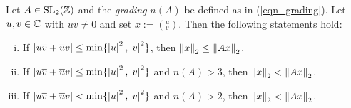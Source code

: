 \begin{theorem}
\label{thm_FunDomUVGlobMin}
Let $A \in \operatorname{SL}_{2}(\mathbb{Z})$ and the \emph{grading} $n(A)$ be defined as in (\ref{eqn_grading}). Let $u,v \in \mathbb{C}$ with $uv \ne 0$ and set $x := ({}^u_v)$. Then the following statements hold:
\begin{enumerate}[(i)]
\item \label{itm_FunDomUVGlobMinA}
If $\left|u\overline{v} + \overline{u}v\right| \le \min\{\left|u\right|^2,\left|v\right|^2\}$, then $\left\| x \right\|_2 \le \left\| Ax \right\|_2$.
\item \label{itm_FunDomUVGlobMinB}
If $\left|u\overline{v} + \overline{u}v\right| \le \min\{\left|u\right|^2,\left|v\right|^2\}$ and $n(A) > 3$, then $\left\| x \right\|_2 < \left\| Ax \right\|_2$.
\item \label{itm_FunDomUVGlobMinC}
If $\left|u\overline{v} + \overline{u}v\right| < \min\{\left|u\right|^2,\left|v\right|^2\}$ and $n(A) > 2$, 
then $\left\| x \right\|_2 < \left\| Ax \right\|_2$.
\end{enumerate}
\end{theorem}
